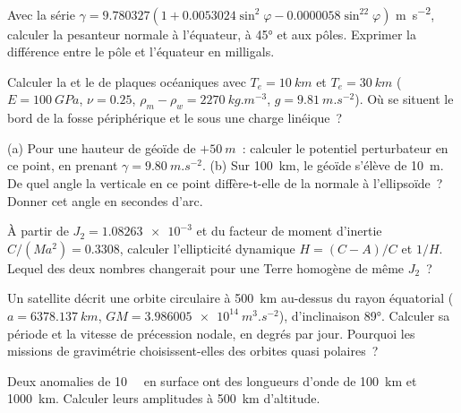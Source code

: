\begin{exercise}[$\star$]\label{exo:b3:gravity-geodesy:3}
Avec la série $\gamma = 9.780327(1 + 0.0053024\sin^2\varphi -
0.0000058\sin^22\varphi)$ \unit{m.s^{-2}}, calculer la pesanteur normale à
l'équateur, à \ang{45} et aux pôles. Exprimer la différence entre le pôle
et l'équateur en milligals.
\end{exercise}

\begin{exercise}[$\star$]\label{exo:b3:gravity-geodesy:4}
Calculer la  et le  de plaques océaniques avec
$T_e = \qty{10}{km}$ et $T_e = \qty{30}{km}$ ($E = \qty{100}{GPa}$,
$\nu = 0.25$, $\rho_m - \rho_w = \qty{2270}{kg.m^{-3}}$, $g =
\qty{9.81}{m.s^{-2}}$). Où se situent le bord de la fosse périphérique et le  sous une
charge linéique~?
\end{exercise}

\begin{exercise}[$\star\star$]\label{exo:b3:gravity-geodesy:5}
(a) Pour une hauteur de géoïde de $+\qty{50}{m}$~: calculer le potentiel perturbateur en ce point,
en prenant $\gamma = \qty{9.80}{m.s^{-2}}$. (b) Sur \qty{100}{km}, le géoïde s'élève
de \qty{10}{m}. De quel angle la verticale en ce point diffère-t-elle de la normale à
l'ellipsoïde~? Donner cet angle en secondes d'arc.
\end{exercise}

\begin{exercise}[$\star\star$]\label{exo:b3:gravity-geodesy:6}
À partir de $J_2 = \num{1.08263e-3}$ et du facteur de moment d'inertie
$C/(Ma^2) = \num{0.3308}$, calculer l'ellipticité dynamique $H = (C - A)/C$ et
$1/H$. Lequel des deux nombres changerait pour une Terre homogène de même $J_2$~?
\end{exercise}

\begin{exercise}[$\star\star$]\label{exo:b3:gravity-geodesy:7}
Un satellite décrit une orbite circulaire à \qty{500}{km} au-dessus du rayon équatorial
($a = \qty{6378.137}{km}$, $GM = \qty{3.986005e14}{m^3.s^{-2}}$), d'inclinaison
\ang{89}. Calculer sa période et la vitesse de précession nodale, en degrés par jour.
Pourquoi les missions de gravimétrie choisissent-elles des orbites quasi polaires~?
\end{exercise}

\begin{exercise}[$\star\star$]\label{exo:b3:gravity-geodesy:8}
Deux anomalies de \qty{10}{\milli\gal} en surface ont des longueurs d'onde de
\qty{100}{km} et \qty{1000}{km}. Calculer leurs amplitudes à \qty{500}{km}
d'altitude.
\end{exercise}

